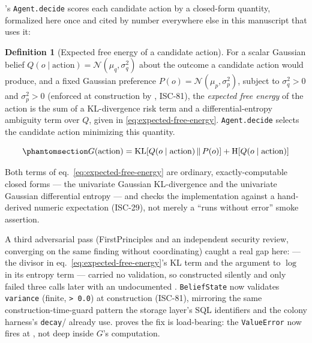\documentclass[
  english,
]{article}
\theoremstyle{definition}
\newtheorem{definition}[theorem]{Definition}
\begin{document}
's \texttt{Agent.decide}
scores each candidate action by a closed-form quantity, formalized here
once and cited by number everywhere else in this manuscript that uses
it:

\begin{definition}[Expected free energy of a candidate action]
For a scalar Gaussian belief \(Q(o \mid \text{action}) = \mathcal{N}(\mu_q, \sigma_q^2)\) about the
outcome a candidate action would produce, and a fixed Gaussian preference \(P(o) = \mathcal{N}(\mu_p,
\sigma_p^2)\), subject to \(\sigma_q^2 > 0\) and \(\sigma_p^2 > 0\) (enforced at construction by
, ISC-81), the \emph{expected free energy} of the action is
the sum of a KL-divergence risk term and a differential-entropy ambiguity term over \(Q\), given in
\cref{eq:expected-free-energy}. \texttt{Agent.decide} selects the candidate action minimizing this
quantity.
\end{definition}

\begin{equation}\protect\phantomsection\label{eq:expected-free-energy}{
G(\text{action}) = \mathrm{KL}\!\left[Q(o \mid \text{action}) \,\|\, P(o)\right] + \mathrm{H}\!\left[Q(o \mid \text{action})\right]
}\end{equation}

Both terms of eq.~\ref{eq:expected-free-energy} are ordinary,
exactly-computable closed forms --- the univariate Gaussian
KL-divergence and the univariate Gaussian differential entropy --- and
 checks the
implementation against a hand-derived numeric expectation (ISC-29), not
merely a ``runs without error'' smoke assertion.

A third adversarial pass (FirstPrinciples and an independent security
review, converging on the same finding without coordinating) caught a
real gap here:  --- the divisor in
eq.~\ref{eq:expected-free-energy}'s KL term and the argument to \(\log\)
in its entropy term --- carried no validation, so
 constructed silently and
only failed three calls later with an undocumented
. \texttt{BeliefState} now validates
\texttt{variance} (finite, \texttt{\textgreater{}\ 0.0}) at construction
(ISC-81), mirroring the same construction-time-guard pattern the storage
layer's SQL identifiers and the colony harness's
\texttt{decay}/ already use.
 proves the fix is
load-bearing: the \texttt{ValueError} now fires at
, not deep inside \(G\)'s computation.
\end{document}
